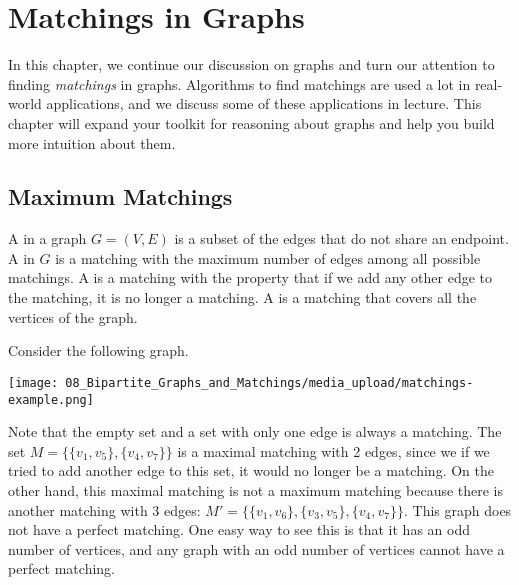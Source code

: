 

\chapter{Matchings in Graphs}
\label{chapter:matchings-in-graphs}

\begin{preamble}
In this chapter, we continue our discussion on graphs and turn our attention to finding \emph{matchings} in graphs. Algorithms to find matchings are used a lot in real-world applications, and we discuss some of these applications in lecture. This chapter will expand your toolkit for reasoning about graphs and help you build more intuition about them.
\end{preamble}



\section{Maximum Matchings}


\begin{flex}
\begin{definition} \label{definition:Matching----maximum-maximal-perfect} 
A  in a graph $G=(V,E)$ is a subset of the edges that do not share an endpoint. A  in $G$ is a matching with the maximum number of edges among all possible matchings. A  is a matching with the property that if we add any other edge to the matching, it is no longer a matching. A  is a matching that covers all the vertices of the graph.
\end{definition}

\begin{example} \label{example:Examples-of-matchings}
Consider the following graph.
\begin{center}
    \texttt{[image: 08\_Bipartite\_Graphs\_and\_Matchings/media\_upload/matchings-example.png]}
\end{center}
Note that the empty set and a set with only one edge is always a matching. The set $M = \{\{v_1, v_5\}, \{v_4,v_7\}\}$ is a maximal matching with 2 edges, since we if we tried to add another edge to this set, it would no longer be a matching. On the other hand, this maximal matching is not a maximum matching because there is another matching with 3 edges: $M' = \{ \{v_1,v_6\}, \{v_3,v_5\}, \{v_4,v_7\} \}$. This graph does not have a perfect matching. One easy way to see this is that it has an odd number of vertices, and any graph with an odd number of vertices cannot have a perfect matching. 
\end{example}
\end{flex}


